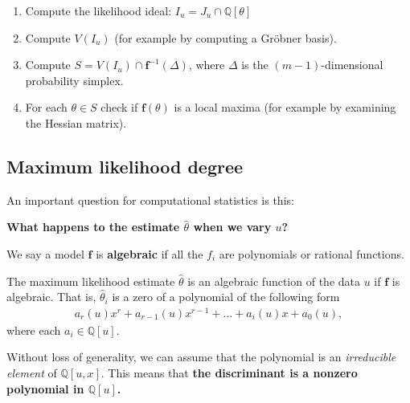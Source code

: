 \documentclass[a4paper, 11pt]{article}
\begin{document}
\begin{remark}[Algorithm]
  \(  \)
\begin{enumerate}
  \item Compute the likelihood ideal: \( I_u = J_u \cap \mathbb Q [\theta] \)
  \item Compute \( V(I_u) \) (for example by computing a Gröbner basis).
  \item Compute \( S = V(I_u) \cap \mathbf f^{-1}(\Delta) \), where \( \Delta \) is the \( (m-1) \)-dimensional probability simplex.
  \item For each \( \theta \in S \) check if \( \mathbf f(\theta) \) is a local maxima (for example by examining the Hessian matrix).
\end{enumerate}
\end{remark}


\subsection{Maximum likelihood degree}
An important question for computational statistics is this:
\begin{mdframed}
  \begin{center}
    \textbf{{What happens to the estimate \( \hat \theta \) when we vary \( u \)?}}
  \end{center}
\end{mdframed}

\begin{defi}
  We say a model \( \mathbf f \) is \textbf{algebraic} if all the \( f_i \) are polynomials or rational functions.
\end{defi}

\begin{prop}
  The maximum likelihood estimate \( \hat \theta \) is an algebraic function of the data \( u \) if \( \mathbf f \) is algebraic. That is, \( \hat \theta_i \) is a zero of a polynomial of the following form 
  \begin{align*}
    a_r(u) x^r + a_{r - 1}(u)x^{r-1} + ... + a_i(u) x + a_0(u),
  \end{align*}
  where each \( a_i \in \mathbb Q[u] \).
\end{prop}

Without loss of generality, we can assume that the polynomial is an \emph{irreducible element} of \( \mathbb Q[u, x] \). This means that \textbf{the discriminant is a nonzero polynomial in \( \mathbb Q[u] \).} 
\end{document}
